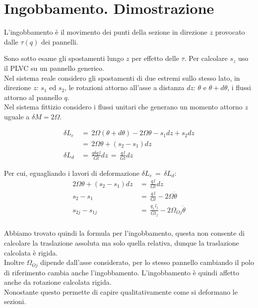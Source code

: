 \section{Ingobbamento. Dimostrazione}

L'ingobbamento è il movimento dei punti della sezione in direzione $z$ provocato dalle $\tau(q)$ dei pannelli.

Sono sotto esame gli spostamenti lungo $z$ per effetto delle $\tau$. Per calcolare $s_z$ uso  il PLVC su un pannello generico.\\
Nel sistema reale considero gli spostamenti di due estremi sullo stesso lato, in direzione $z$: $s_1$ ed $s_2$, le rotazioni attorno all'asse a distanza $dz$: $\theta$ e $\theta+d\theta$, i flussi attorno al pannello $q$.\\
Nel sistema fittizio considero i flussi unitari che generano un momento attorno $z$ uguale a $\delta M=2\Omega$. 

\begin{align*}
    \delta L_e\,&=\, 2\Omega(\theta+d\theta)-2\Omega\theta -s_1dz+s_2dz\\
    &=\, 2\Omega\theta + (s_2-s_1)dz\\
    \delta L_d \,&=\, \frac{q\delta q\,l}{Gt}dz\,=\, \frac{q\,l}{Gt}dz
\end{align*}

Per cui, eguagliando i lavori di deformazione $ \delta L_e\, =\,\delta L_d$:
\begin{align*}
    2\Omega\theta + (s_2-s_1)dz \,&=\,\frac{q\,l}{Gt}dz\\
    s_2-s_1 \,&=\,\frac{q\,l}{Gt}- 2\Omega\dot{\theta}\\
     s_{2j}-s_{1j} \,&=\,\frac{q_j\,l_j}{Gt_j}- 2\Omega_{Oj}\dot{\theta}\\
\end{align*}

Abbiamo trovato quindi la formula per l'ingobbamento, questa non consente di calcolare la traslazione assoluta ma solo quella relativa, dunque la traslazione calcolata è rigida.\\
Inoltre $\Omega_{Oj}$ dipende dall'asse considerato, per lo stesso pannello cambiando il polo di riferimento cambia anche l'ingobbamento. L'ingobbamento è quindi affetto anche da rotazione calcolata rigida.\\
Nonostante questo permette di capire qualitativamente come si deformano le sezioni.